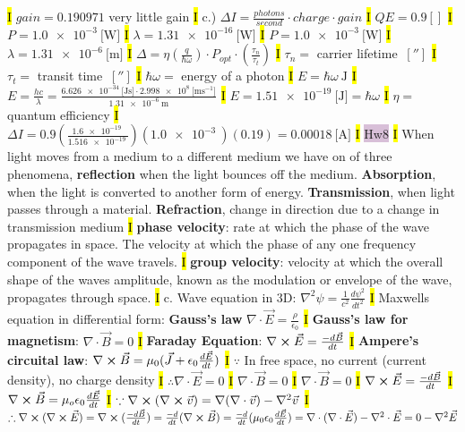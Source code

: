 \documentclass[fontsize=3]{scrartcl}
\begin{document}
\hl{I}
$gain = 0.190971$ very little gain
\hl{I}
c.) $\Delta I = \frac{photons}{second} \cdot charge \cdot gain$
\hl{I}
$QE = 0.9[]$
\hl{I}
$P = \SI{1.0e-3}{[\watt]}$
\hl{I}
$\lambda = \SI{1.31e-16}{ [\watt] }$
\hl{I}
$P = \SI{1.0e-3}{[\watt]}$
\hl{I}
$\lambda = \SI{1.31e-6}{[\meter]}$
\hl{I}
$\Delta = \eta (\frac{q}{\hbar \omega}) \cdot P_{opt} \cdot (\frac{\tau_n}{\tau_t})$
\hl{I}
$\tau_n =$ carrier lifetime $\SI{}{[\second]}$
\hl{I}
$\tau_t =$ transit time $\SI{}{[\second]}$
\hl{I}
$\hbar \omega =$ energy of a photon
\hl{I}
$E = \hbar \omega \SI{}{\joule}$
\hl{I}
$E = \frac{hc}{\lambda} = \frac{ \SI{6.626e-34}{[\joule \second]} \cdot \SI{2.998e8}{[\meter \second^{-1}]} }{ \SI{1.31e-6}{ \meter } }$
\hl{I}
$E =  \SI{1.51e-19}{ [ \joule ] } = \hbar \omega $
\hl{I}
$\eta =$ quantum efficiency
\hl{I}
$ \Delta I =  0.9( \frac{ \SI{1.6e-19}{} } { \SI{1.516e-19}{} } ) (\SI{1.0e-3}{}) (0.19) = \SI{0.00018}{[\ampere]}$
\hl{I}
\colorbox{Thistle}{Hw8}
\hl{I}
When light moves from a medium to a different medium we have on of three phenomena,
\textbf{reflection} when the light bounces off the medium. 
\textbf{Absorption}, when the light is converted to another form of energy.
\textbf{Transmission}, when light passes through a material.
\textbf{Refraction}, change in direction due to a change in transmission medium
\hl{I}
\textbf{phase velocity}: rate at which the phase of the wave propagates in space. The velocity at which the phase of any one frequency component of the wave travels.
\hl{I}
\textbf{group velocity}: velocity at which the overall shape of the waves amplitude, known as the modulation or envelope of the wave, propagates through space.
\hl{I}
c. Wave equation in 3D: $\nabla^2 \psi = \frac{1}{c^2}\frac{d \psi^2}{dt^2}$
\hl{I}
Maxwells equation in differential form: \textbf{Gauss's law} $\nabla \cdot \vec{E} = \frac{\rho}{\epsilon_0}$
\hl{I}
\textbf{Gauss's law for magnetism}: $\nabla \cdot \vec{B} = 0$
\hl{I}
\textbf{Faraday Equation}: $\nabla \cross \vec{E} = \frac{-d\vec{B}}{dt}$
\hl{I}
\textbf{Ampere's circuital law}: $\nabla \cross \vec{B} = \mu_0 (\vec{J} + \epsilon_0 \frac{d\vec{E}}{dt})$
\hl{I}
$\because $ In free space, no current (current density), no charge density
\hl{I}
$\therefore \nabla \cdot \vec{E} = 0$
\hl{I}
$\nabla \cdot \vec{B} = 0$
\hl{I}
$\nabla \cdot \vec{B} = 0$
\hl{I}
$\nabla \cross \vec{E} = \frac{-d\vec{B}}{dt}$
\hl{I}
$\nabla \cross \vec{B} = \mu_o \epsilon_0 \frac{d\vec{E}}{dt}$
\hl{I}
$\because \nabla \cross (\nabla \cross \vec{v}) = \nabla (\nabla \cdot \vec{v}) - \nabla^2 \vec{v}$
\hl{I}
$\therefore \nabla \cross (\nabla \cross \vec{E}) = \nabla \cross (\frac{-d\vec{B}}{dt}) = \frac{-d}{dt}(\nabla \cross \vec{B}) = \frac{-d}{dt}(\mu_0 \epsilon_0 \frac{d\vec{E}}{dt}) = \nabla \cdot (\nabla \cdot \vec{E}) - \nabla^2 \cdot \vec{E} = 0-\nabla^2 \vec{E}$
\end{document}
